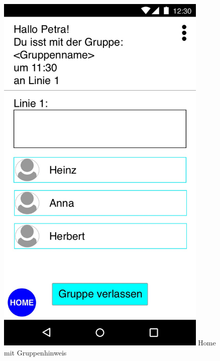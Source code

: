 \documentclass[a4paper]{scrreprt}
\begin{document}
\begin{figure}[H]
	\centering
	\begin{minipage}[b]{0.48\textwidth}
		\centering
		\includegraphics[width=0.9\textwidth]{res/GUI/07.jpeg}
		\label{Fig.7}
		Home mit Gruppenhinweis
	\end{minipage}
	\begin{minipage}[b]{0.48\textwidth}
	\end{minipage}
\end{figure}
\end{document}

